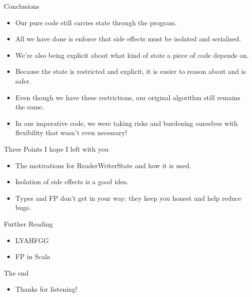 \documentclass[professionalFonts,aspectratio=169]{beamer}
\begin{document}
\begin{frame}{Conclusions}
\begin{itemize}
\pause \item Our pure code still carries state through the program.
\pause \item All we have done is enforce that side effects must be isolated and
serialised.
\pause \item We're also being explicit about what kind of state a piece of code
depends on.
\pause \item Because the state is restricted and explicit, it is easier to
reason about and is safer.
\pause \item Even though we have these restrictions, our original algorithm
still remains the same.
\pause \item In our imperative code, we were taking risks and burdening
ourselves with flexibility that wasn't even necessary!
\end{itemize}
\end{frame}

\begin{frame}{Three Points I hope I left with you}
\begin{itemize}
\pause \item The motivations for ReaderWriterState and how it is used.
\pause \item Isolation of side effects is a good idea.
\pause \item Types and FP don't get in your way: they keep you honest and help reduce bugs.
\end{itemize}
\end{frame}

\begin{frame}{Further Reading}
\begin{itemize}
\pause \item LYAHFGG
\pause \item FP in Scala
\end{itemize}
\end{frame}

\begin{frame}{The end}
\begin{itemize}
\item Thanks for listening!
\end{itemize}
\end{frame}
\end{document}
